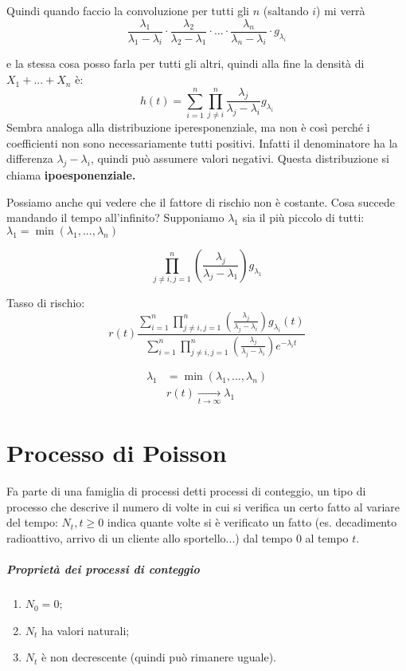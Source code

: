 \documentclass[a4paper,12pt]{book}
\begin{document}
Quindi quando faccio la convoluzione per tutti gli $ n $ (saltando $ i $) mi verrà 
$$\frac{\lambda_1}{\lambda_1 - \lambda_i} \cdot \frac{\lambda_2}{\lambda_2  - \lambda_1} \cdot  ... \cdot \frac{\lambda_n}{\lambda_n - \lambda_i} \cdot g_{\lambda_i}$$

e la stessa cosa posso farla per tutti gli altri, quindi alla fine la densità di $ X_1 + ... + X_n $ è:
$$ h(t) = \sum_{i = 1}^n \prod_{j \ne i}^{n} \frac{\lambda_j}{\lambda_j - \lambda_i} g_{\lambda_i}$$
Sembra analoga alla distribuzione iperesponenziale, ma non è così perché i coefficienti non sono necessariamente tutti positivi. Infatti il denominatore ha la differenza $ \lambda_j - \lambda_i $, quindi può assumere valori negativi. Questa distribuzione si chiama \textbf{ipoesponenziale.} 

Possiamo anche qui vedere che il fattore di rischio non è costante. Cosa succede mandando il tempo all'infinito? Supponiamo $\lambda_1$ sia il più piccolo di tutti: $\lambda_1 = \min(\lambda_1, ..., \lambda_n)$

$$ \prod_{j \ne i, j = 1}^{n} \left(\frac{\lambda_j}{\lambda_j - \lambda_1}\right) g_{\lambda_1} $$ 

Tasso di rischio:
$$ r(t) \frac{\sum_{i=1}^{n}\prod_{j\ne i, j=1}^{n} \left(\frac{\lambda_j}{\lambda_j - \lambda_i}\right)g_{\lambda_i}(t)}{\sum_{i=1}^{n}\prod_{j\ne i, j=1}^{n} \left(\frac{\lambda_j}{\lambda_j - \lambda_i}\right) e^{-\lambda_i t}} $$

\begin{align*}
	\lambda_1 & = \min(\lambda_1, ..., \lambda_n) \\
	& r(t) \underset{t \to \infty}{\longrightarrow} \lambda_1
\end{align*}

\chapter{Processo di Poisson}
Fa parte di una famiglia di processi detti processi di conteggio, un tipo di processo che descrive il numero di volte in cui si verifica un certo fatto al variare del tempo: $ N_t, t \ge 0 $ indica quante volte si è verificato un fatto (es. decadimento radioattivo, arrivo di un cliente allo sportello...) dal tempo 0 al tempo $ t $.

\paragraph{Proprietà dei processi di conteggio}
\begin{enumerate}
	\item $ N_0 = 0 $;
	\item $ N_t $ ha valori naturali;
	\item $ N_t $ è non decrescente (quindi può rimanere uguale).
\end{enumerate}
\end{document}
